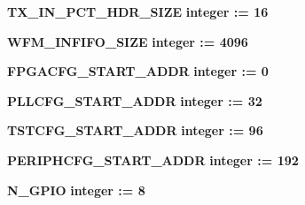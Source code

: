 \begin{DoxyCompactItemize}
\item 
{\bf T\+X\+\_\+\+I\+N\+\_\+\+P\+C\+T\+\_\+\+H\+D\+R\+\_\+\+S\+I\+ZE} {\bfseries {\bfseries \textcolor{comment}{integer}\textcolor{vhdlchar}{ }\textcolor{vhdlchar}{ }\textcolor{vhdlchar}{\+:}\textcolor{vhdlchar}{=}\textcolor{vhdlchar}{ }\textcolor{vhdlchar}{ } \textcolor{vhdldigit}{16} \textcolor{vhdlchar}{ }}}
\item 
{\bf W\+F\+M\+\_\+\+I\+N\+F\+I\+F\+O\+\_\+\+S\+I\+ZE} {\bfseries {\bfseries \textcolor{comment}{integer}\textcolor{vhdlchar}{ }\textcolor{vhdlchar}{ }\textcolor{vhdlchar}{\+:}\textcolor{vhdlchar}{=}\textcolor{vhdlchar}{ }\textcolor{vhdlchar}{ } \textcolor{vhdldigit}{4096} \textcolor{vhdlchar}{ }}}
\item 
{\bf F\+P\+G\+A\+C\+F\+G\+\_\+\+S\+T\+A\+R\+T\+\_\+\+A\+D\+DR} {\bfseries {\bfseries \textcolor{comment}{integer}\textcolor{vhdlchar}{ }\textcolor{vhdlchar}{ }\textcolor{vhdlchar}{\+:}\textcolor{vhdlchar}{=}\textcolor{vhdlchar}{ }\textcolor{vhdlchar}{ } \textcolor{vhdldigit}{0} \textcolor{vhdlchar}{ }}}
\item 
{\bf P\+L\+L\+C\+F\+G\+\_\+\+S\+T\+A\+R\+T\+\_\+\+A\+D\+DR} {\bfseries {\bfseries \textcolor{comment}{integer}\textcolor{vhdlchar}{ }\textcolor{vhdlchar}{ }\textcolor{vhdlchar}{\+:}\textcolor{vhdlchar}{=}\textcolor{vhdlchar}{ }\textcolor{vhdlchar}{ } \textcolor{vhdldigit}{32} \textcolor{vhdlchar}{ }}}
\item 
{\bf T\+S\+T\+C\+F\+G\+\_\+\+S\+T\+A\+R\+T\+\_\+\+A\+D\+DR} {\bfseries {\bfseries \textcolor{comment}{integer}\textcolor{vhdlchar}{ }\textcolor{vhdlchar}{ }\textcolor{vhdlchar}{\+:}\textcolor{vhdlchar}{=}\textcolor{vhdlchar}{ }\textcolor{vhdlchar}{ } \textcolor{vhdldigit}{96} \textcolor{vhdlchar}{ }}}
\item 
{\bf P\+E\+R\+I\+P\+H\+C\+F\+G\+\_\+\+S\+T\+A\+R\+T\+\_\+\+A\+D\+DR} {\bfseries {\bfseries \textcolor{comment}{integer}\textcolor{vhdlchar}{ }\textcolor{vhdlchar}{ }\textcolor{vhdlchar}{\+:}\textcolor{vhdlchar}{=}\textcolor{vhdlchar}{ }\textcolor{vhdlchar}{ } \textcolor{vhdldigit}{192} \textcolor{vhdlchar}{ }}}
\item 
{\bf N\+\_\+\+G\+P\+IO} {\bfseries {\bfseries \textcolor{comment}{integer}\textcolor{vhdlchar}{ }\textcolor{vhdlchar}{ }\textcolor{vhdlchar}{\+:}\textcolor{vhdlchar}{=}\textcolor{vhdlchar}{ }\textcolor{vhdlchar}{ } \textcolor{vhdldigit}{8} \textcolor{vhdlchar}{ }}}
\end{DoxyCompactItemize}
